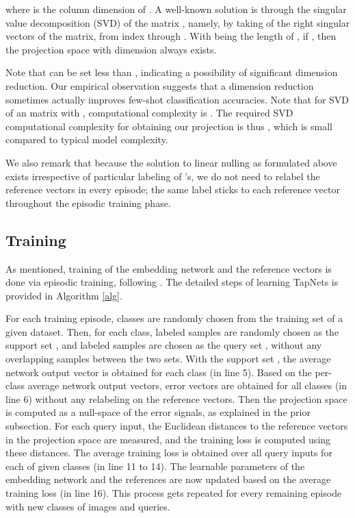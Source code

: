 \documentclass{article}
\begin{document}
where  is the column dimension of .  
A well-known solution is through the singular value decomposition (SVD) of the matrix , namely, by taking  of the right singular vectors of the matrix, from index  through . With  being the length of , if , then the projection space  with dimension  always exists.

Note that  can be set less than , indicating a possibility of significant dimension reduction. Our empirical observation suggests that a 
dimension reduction sometimes actually improves few-shot classification accuracies. Note that for SVD of an  matrix with , computational complexity is . The required SVD computational complexity for obtaining our projection is thus , which is small compared to typical model complexity.

We also remark that because the solution to linear nulling as formulated above exists irrespective of particular labeling of 's, we do not need to relabel the reference vectors in every episode; the same label sticks to each reference vector throughout the episodic training phase.  




\subsection{Training}
As mentioned, training of the embedding network  and the reference vectors  is done via episodic training, following \cite{MN}.
The detailed steps of learning TapNets is provided in Algorithm \ref{alg}. 

For each training episode,  classes are randomly chosen from the training set of a given dataset. 
Then, for each class,  labeled samples are randomly chosen as the support set , and   labeled samples are chosen as the query set , without any overlapping samples between the two sets.
With the support set , the average network output vector  is obtained for each class (in line 5). Based on the per-class average network output vectors, error vectors are obtained for all classes (in line 6)
without any relabeling on the reference vectors.
Then the projection space  is computed as a null-space of the error signals, as explained in the prior subsection.
For each query input, the Euclidean distances to the reference vectors in the projection space  are measured, and the training loss is computed using these distances.
The average training loss is obtained over all  query inputs for each of  given classes (in line 11 to 14).
The learnable parameters  of the embedding network and the references  are now updated based on the average training loss (in line 16). This process gets repeated for every remaining episode with new classes of images and queries. 
\end{document}
